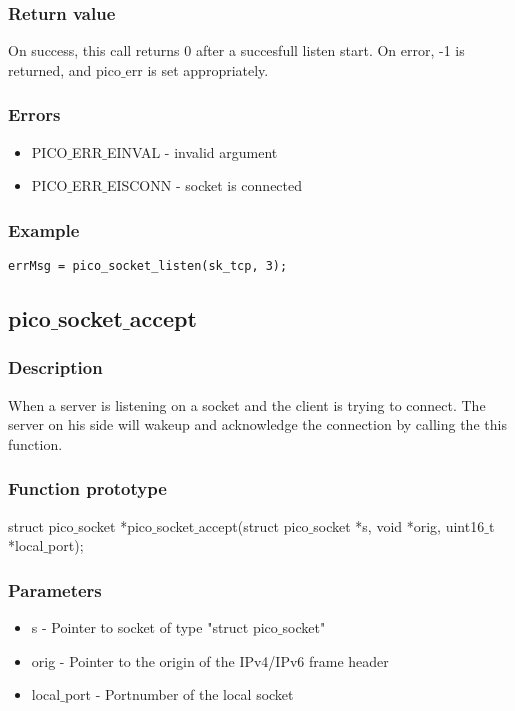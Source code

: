 \subsubsection*{Return value}
On success, this call returns 0 after a succesfull listen start.
On error, -1 is returned, and pico$\_$err is set appropriately. 

\subsubsection*{Errors}
\begin{itemize}
\item PICO$\_$ERR$\_$EINVAL - invalid argument
\item PICO$\_$ERR$\_$EISCONN - socket is connected
\end{itemize}

\subsubsection*{Example}
\begin{verbatim}
errMsg = pico_socket_listen(sk_tcp, 3);
\end{verbatim}


\subsection{pico$\_$socket$\_$accept}

\subsubsection*{Description}
When a server is listening on a socket and the client is trying to connect.
The server on his side will wakeup and acknowledge the connection by calling the this function.

\subsubsection*{Function prototype}
struct pico$\_$socket *pico$\_$socket$\_$accept(struct pico$\_$socket *s, void *orig, uint16$\_$t *local$\_$port);

\subsubsection*{Parameters}
\begin{itemize}
\item s - Pointer to socket of type "struct pico$\_$socket"
\item orig - Pointer to the origin of the IPv4/IPv6 frame header
\item local$\_$port - Portnumber of the local socket
\end{itemize}


